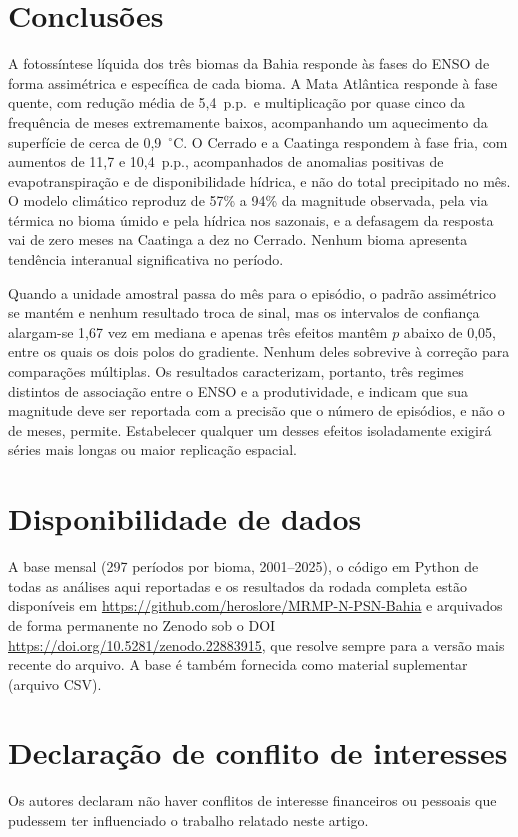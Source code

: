 \documentclass[a4paper,fleqn]{cas-sc}
\begin{document}
\section{Conclusões}

A fotossíntese líquida dos três biomas da Bahia responde às fases do ENSO de forma assimétrica e específica de cada bioma. A Mata Atlântica responde à fase quente, com redução média de 5,4~p.p.\ e multiplicação por quase cinco da frequência de meses extremamente baixos, acompanhando um aquecimento da superfície de cerca de 0,9~$^{\circ}$C. O Cerrado e a Caatinga respondem à fase fria, com aumentos de 11,7 e 10,4~p.p., acompanhados de anomalias positivas de evapotranspiração e de disponibilidade hídrica, e não do total precipitado no mês. O modelo climático reproduz de 57\% a 94\% da magnitude observada, pela via térmica no bioma úmido e pela hídrica nos sazonais, e a defasagem da resposta vai de zero meses na Caatinga a dez no Cerrado. Nenhum bioma apresenta tendência interanual significativa no período.

Quando a unidade amostral passa do mês para o episódio, o padrão assimétrico se mantém e nenhum resultado troca de sinal, mas os intervalos de confiança alargam-se 1,67 vez em mediana e apenas três efeitos mantêm $p$ abaixo de 0,05, entre os quais os dois polos do gradiente. Nenhum deles sobrevive à correção para comparações múltiplas. Os resultados caracterizam, portanto, três regimes distintos de associação entre o ENSO e a produtividade, e indicam que sua magnitude deve ser reportada com a precisão que o número de episódios, e não o de meses, permite. Estabelecer qualquer um desses efeitos isoladamente exigirá séries mais longas ou maior replicação espacial.

\section*{Disponibilidade de dados}
A base mensal (297 períodos por bioma, 2001--2025), o código em Python de todas as análises aqui reportadas e os resultados da rodada completa estão disponíveis em \url{https://github.com/heroslore/MRMP-N-PSN-Bahia} e arquivados de forma permanente no Zenodo sob o DOI \url{https://doi.org/10.5281/zenodo.22883915}, que resolve sempre para a versão mais recente do arquivo. A base é também fornecida como material suplementar (arquivo CSV).

\section*{Declaração de conflito de interesses}
Os autores declaram não haver conflitos de interesse financeiros ou pessoais que pudessem ter influenciado o trabalho relatado neste artigo.
\end{document}
